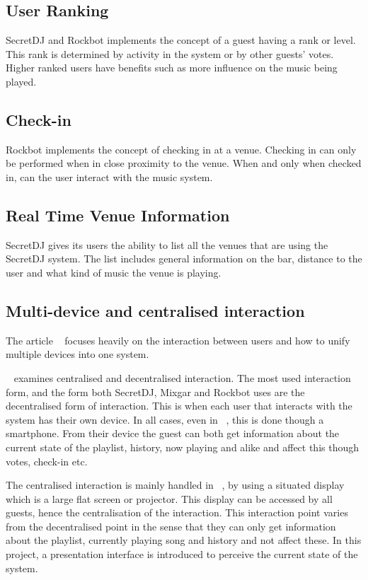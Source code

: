 \subsection{User Ranking}
SecretDJ and Rockbot implements the concept of a guest having a rank or
level. This rank is determined by activity in the system or by other
guests' votes. Higher ranked users have benefits such as more influence on the music being played.

\subsection{Check-in}
Rockbot implements the concept of checking in at a venue. Checking in
can only be performed when in close proximity to the venue. When and
only when checked in, can the user interact with the music system.

\subsection{Real Time Venue Information}
SecretDJ gives its users the ability to list all the venues that are
using the SecretDJ system. The list includes general information on
the bar, distance to the user and what kind of music the venue is
playing.

\subsection{Multi-device and centralised interaction}
\label{MDCI}
The article ~\cite{sorensen2012} focuses heavily on the interaction between users and how to unify multiple devices into one system.

~\cite{sorensen2012} examines centralised and
decentralised interaction. The most used interaction form, and the
form both SecretDJ, Mixgar and Rockbot uses are the decentralised form
of interaction. This is when each user that interacts with the system
has their own device. In all cases, even in
~\cite{sorensen2012}, this is done though a
smartphone. From their device the guest can both get information about
the current state of the playlist, history, now playing and alike and
affect this though votes, check-in etc.

The centralised interaction is mainly handled in
~\cite{sorensen2012}, by using a situated
display which is a large flat screen or projector. This display can be
accessed by all guests, hence the centralisation of the
interaction. This interaction point varies from the decentralised
point in the sense that they can only get information about the
playlist, currently playing song and history and not affect these. In
this project, a presentation interface is introduced to perceive the
current state of the system.
